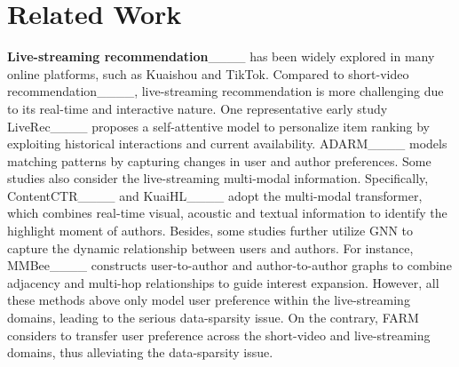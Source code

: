 \section{Related Work}
\textbf{Live-streaming recommendation}____ has been widely explored in many online platforms, such as Kuaishou and TikTok. 
Compared to short-video recommendation____, live-streaming recommendation is more challenging due to its real-time and interactive nature.
One representative early study LiveRec____ proposes a self-attentive model to personalize item ranking by exploiting historical interactions and current availability. ADARM____ models matching patterns by capturing changes in user and author preferences. 
Some studies also consider the live-streaming multi-modal information. Specifically, ContentCTR____ and KuaiHL____ adopt the multi-modal transformer, which combines real-time visual, acoustic and textual information to identify the highlight moment of authors. Besides, some studies further utilize GNN to capture the dynamic relationship between users and authors.  
For instance, MMBee____ constructs user-to-author and author-to-author graphs to combine adjacency and multi-hop relationships to guide interest expansion. 
However, all these methods above only model user preference within the live-streaming domains, leading to the serious data-sparsity issue. On the contrary, FARM considers to transfer user preference across the short-video and live-streaming domains, thus alleviating the data-sparsity issue.






